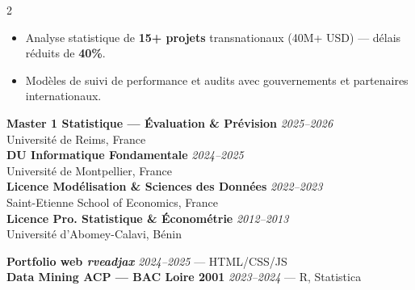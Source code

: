 \documentclass[9pt,a4paper,ragged2e,withhyper]{altacv}
\begin{document}
\begin{paracol}{2}
\vspace{-2pt}\divider\vspace{-2pt}

\vspace{-4pt}
\begin{itemize}
  \item Analyse statistique de \textbf{15+ projets} transnationaux (40M+ USD) — délais réduits de \textbf{40\%}.
  \item Modèles de suivi de performance et audits avec gouvernements et partenaires internationaux.
\end{itemize}


\vspace{-2pt}
{\scriptsize
\textbf{\color{accent}Master 1 Statistique — Évaluation \& Prévision} \hfill \textit{2025--2026}\\
\color{body}Université de Reims, France\\[2pt]
\textbf{\color{accent}DU Informatique Fondamentale} \hfill \textit{2024--2025}\\
\color{body}Université de Montpellier, France\\[2pt]
\textbf{\color{accent}Licence Modélisation \& Sciences des Données} \hfill \textit{2022--2023}\\
\color{body}Saint-Etienne School of Economics, France\\[2pt]
\textbf{\color{accent}Licence Pro. Statistique \& Économétrie} \hfill \textit{2012--2013}\\
\color{body}Université d'Abomey-Calavi, Bénin
}

{\scriptsize
\textbf{\color{accent}Portfolio web \emph{rveadjax}} \hfill \textit{2024--2025} — HTML/CSS/JS\\[2pt]
\textbf{\color{accent}Data Mining ACP — BAC Loire 2001} \hfill \textit{2023--2024} — R, Statistica
}

\switchcolumn




\vspace{2pt}
\\[2pt]
\\[2pt]


\end{paracol}
\end{document}

